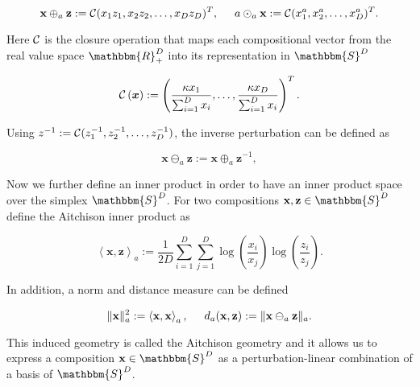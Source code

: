 \begin{equation}
\textbf{x}\oplus_a \textbf{z} := \mathcal{C}(x_1z_1,x_2z_2,\ldots,x_Dz_D)^T, \hspace{0.5cm} a \odot_a \textbf{x} := \mathcal{C}(x_1^a,x_2^a,\ldots,x_D^a)^T.
\label{eq:Simplex Operationen}
\end{equation}

Here $\mathcal{C}$ is the closure operation that maps each compositional vector from the real value space $\mathbbm{R}_+^D$ into its representation in $\mathbbm{S}^D$

\begin{equation}
\mathcal{C} \left(\bm{x}\right) := \left(\frac{\kappa x_1}{\sum_{i=1}^D x_i},\ldots, \frac{\kappa x_D}{\sum_{i=1}^D x_i}\right)^T.
\label{eq:Closure Operation}
\end{equation}


Using $z^{-1} := \mathcal{C}(z_1^{-1},z_2^{-1},\ldots,z_D^{-1})$, the inverse perturbation can be defined as 

\begin{equation}
\textbf{x} \ominus_a \textbf{z} := \textbf{x} \oplus_a \textbf{z}^{-1},
\label{eq: Inverse Perturbation}
\end{equation}

Now we further define an inner product in order to have an inner product space over the simplex $\mathbbm{S}^D$. For two compositions $\textbf{x},\textbf{z} \in \mathbbm{S}^D$ define the Aitchison inner product as 

\begin{equation}
\left\langle \textbf{x},\textbf{z} \right\rangle_a := \frac{1}{2D}\sum_{i=1}^{D}\sum_{j=1}^{D}\log(\frac{x_i}{x_j})\log(\frac{z_i}{z_j}).
\label{eq:Aitchon inner product}
\end{equation}

In addition, a norm and distance measure can be defined

\begin{equation}
\lVert\textbf{x}\rVert_a^2 := \left\langle  \textbf{x},\textbf{x} \right\rangle_a, \hspace{0.5cm} d_a(\textbf{x},\textbf{z}) := \lVert\textbf{x} \ominus_a \textbf{z}\rVert_a.
\label{eq:Simplex Norm and Distance}
\end{equation}

This induced geometry is called the Aitchison geometry and it allows us to express a composition $\textbf{x} \in \mathbbm{S}^D$ as a perturbation-linear combination of a basis of $\mathbbm{S}^D$.

